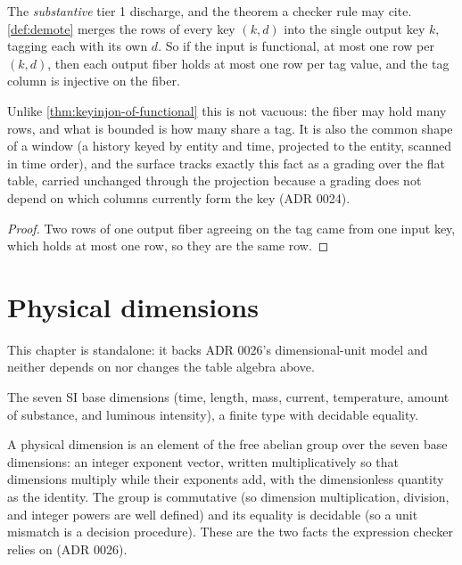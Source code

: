\begin{theorem}
  \label{thm:keyinjon-demote-tag}\leanok
  The \emph{substantive} tier 1 discharge, and the theorem a checker rule may
  cite.  \ref{def:demote} merges the rows of every key $(k,d)$ into the single
  output key $k$, tagging each with its own $d$.  So if the input is
  functional, at most one row per $(k,d)$, then each output fiber holds at most
  one row per tag value, and the tag column is injective on the fiber.

  Unlike \ref{thm:keyinjon-of-functional} this is not vacuous: the fiber may
  hold many rows, and what is bounded is how many share a tag.  It is also the
  common shape of a window (a history keyed by entity and time, projected to
  the entity, scanned in time order), and the surface tracks exactly this fact
  as a grading over the flat table, carried unchanged through the projection
  because a grading does not depend on which columns currently form the key
  (ADR 0024).
\end{theorem}
\begin{proof}\leanok
  Two rows of one output fiber agreeing on the tag came from one input key,
  which holds at most one row, so they are the same row.
\end{proof}

\chapter{Physical dimensions}

This chapter is standalone: it backs ADR 0026's dimensional-unit model and
neither depends on nor changes the table algebra above.

\begin{definition}
  \label{def:base-dimension}\leanok
  The seven SI base dimensions (time, length, mass, current, temperature,
  amount of substance, and luminous intensity), a finite type with decidable
  equality.
\end{definition}

\begin{definition}[Dimension]
  \label{def:dimension}\leanok
  A physical dimension is an element of the free abelian group over the seven
  base dimensions: an integer exponent vector, written multiplicatively so
  that dimensions multiply while their exponents add, with the dimensionless
  quantity as the identity.  The group is commutative (so dimension
  multiplication, division, and integer powers are well defined) and its
  equality is decidable (so a unit mismatch is a decision procedure).  These
  are the two facts the expression checker relies on (ADR 0026).
\end{definition}

